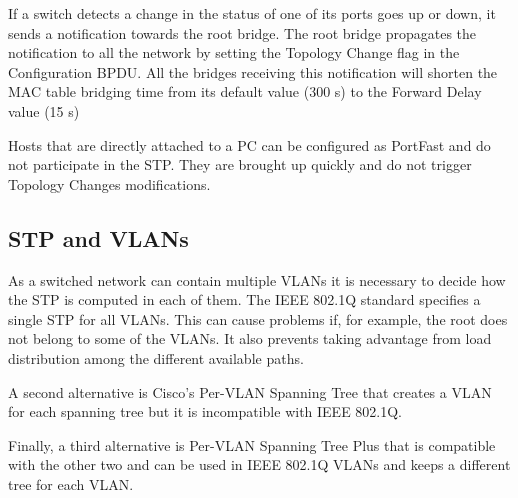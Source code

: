 If a switch detects a change in the status of one of its ports goes up or down, it sends a notification towards the root bridge.
The root bridge propagates the notification to all the network by setting the Topology Change flag in the Configuration BPDU.
All the bridges receiving this notification will shorten the MAC table bridging time from its default value (300 s) to the Forward Delay value (15 s)

Hosts that are directly attached to a PC can be configured as PortFast and do not participate in the STP.
They are brought up quickly and do not trigger Topology Changes modifications.

\subsection{STP and VLANs}

As a switched network can contain multiple VLANs it is necessary to decide how the STP is computed in each of them.
The IEEE 802.1Q standard specifies a single STP for all VLANs.
This can cause problems if, for example, the root does not belong to some of the VLANs.
It also prevents taking advantage from load distribution among the different available paths.

A second alternative is Cisco's Per-VLAN Spanning Tree that creates a VLAN for each spanning tree but it is incompatible with IEEE 802.1Q.

Finally, a third alternative is Per-VLAN Spanning Tree Plus that is compatible with the other two and can be used in IEEE 802.1Q VLANs and keeps a different tree for each VLAN.
